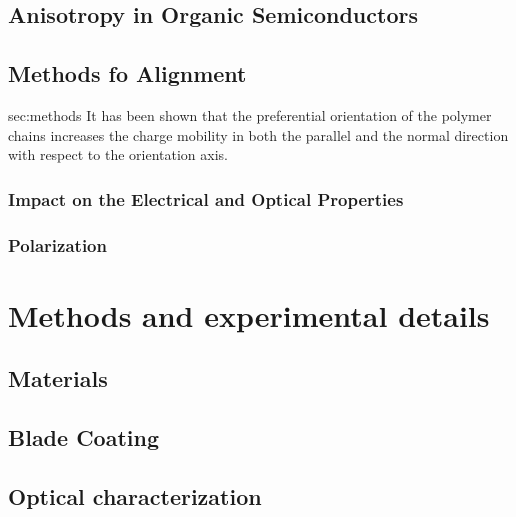 \documentclass  [
  paper    = a4,
  BCOR     = 10mm,
  twoside,
  fontsize = 12pt,
  fleqn,
  toc      = bibnumbered,
  toc      = listofnumbered,
  numbers  = noendperiod,
  headings = normal,
  listof   = leveldown,
  version  = 3.03
]                                       {scrreprt}
\begin{document}
	\section{Anisotropy in Organic Semiconductors}
	
	\section{Methods fo Alignment}{sec:methods}
	It has been shown that the preferential orientation of the polymer chains increases the charge mobility in both the parallel and the normal direction with respect to the orientation axis.
		
		\subsection{Impact on the Electrical and Optical Properties}
		
		\subsection{Polarization}
		
		
		
		
		
\chapter{Methods and experimental details}\label{cha:experimental}
	\section{Materials}
	\section{Blade Coating}
	\section{Optical characterization}
\end{document}

